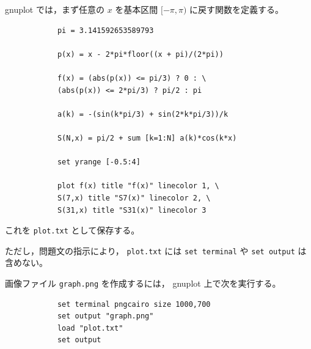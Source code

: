 	\begin{solution}
		gnuplot では，まず任意の \(x\) を基本区間 \([-\pi,\pi)\) に戻す関数を定義する。
		
		\begin{verbatim}
			pi = 3.141592653589793
			
			p(x) = x - 2*pi*floor((x + pi)/(2*pi))
			
			f(x) = (abs(p(x)) <= pi/3) ? 0 : \
			(abs(p(x)) <= 2*pi/3) ? pi/2 : pi
			
			a(k) = -(sin(k*pi/3) + sin(2*k*pi/3))/k
			
			S(N,x) = pi/2 + sum [k=1:N] a(k)*cos(k*x)
			
			set yrange [-0.5:4]
			
			plot f(x) title "f(x)" linecolor 1, \
			S(7,x) title "S7(x)" linecolor 2, \
			S(31,x) title "S31(x)" linecolor 3
		\end{verbatim}
		
		これを \texttt{plot.txt} として保存する。
		
		ただし，問題文の指示により，
		\texttt{plot.txt} には \texttt{set terminal} や \texttt{set output} は含めない。
		
		画像ファイル \texttt{graph.png} を作成するには，
		gnuplot 上で次を実行する。
		
		\begin{verbatim}
			set terminal pngcairo size 1000,700
			set output "graph.png"
			load "plot.txt"
			set output
		\end{verbatim}
	\end{solution}